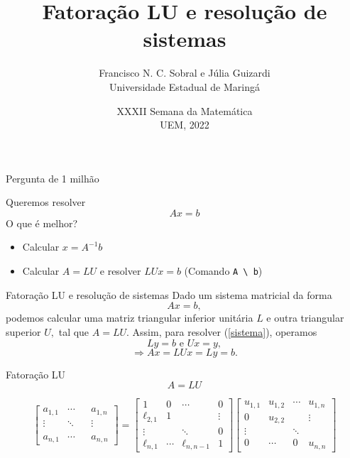 \documentclass[]{beamer}
\author[Sobral, Guizardi]{Francisco N. C. Sobral e Júlia Guizardi\\ Universidade Estadual de Maringá}
\date[XXIX SEMAT]{XXXII Semana da Matemática\\UEM, 2022}
\title[Mat. Mult.]{Fatoração LU e resolução de sistemas}
\newcommand{\code}[1]{\colorbox[gray]{0.8}{\texttt{#1}}}
\begin{document}
\begin{frame}[plain]
\titlepage
\end{frame}

\begin{frame}{Pergunta de 1 milhão}

  Queremos resolver
  \[
    Ax = b
  \]
  O que é melhor?
  \begin{itemize}
  \item Calcular $x = A^{-1} b$
  \item Calcular $A = LU$ e resolver $LUx = b$ (Comando \code{A \textbackslash\ b})
  \end{itemize}
  
\end{frame}

\begin{frame}{Fatoração LU e resolução de sistemas}
	Dado um sistema matricial da forma 
	\begin{equation}\label{sistema}
	Ax=b,
	\end{equation}
	podemos calcular uma matriz triangular inferior unitária $L$ e outra triangular superior $U,$ tal que $A=LU.$ Assim, para resolver (\ref{sistema}), operamos
	$$Ly=b \text{  e  } Ux=y,$$
	$$\Rightarrow Ax=LUx=Ly=b.$$
\end{frame}

\begin{frame}{Fatoração LU}
	\begin{equation}
	A=LU
	\end{equation}
	
	$$
	\begin{bmatrix}
	a_{1,1} & \cdots &  & a_{1,n}\\
	\vdots & \ddots  & & \vdots\\
	& &  & \\
	a_{n,1} & \cdots &  & a_{n,n}
	\end{bmatrix}
	=
	\begin{bmatrix}
	1 & 0 & \cdots & 0\\
	\ell_{2,1} & 1 & & \vdots\\
	\vdots & & \ddots & 0\\
	\ell_{n,1} & \cdots & \ell_{n,n-1} & 1
	\end{bmatrix}\begin{bmatrix}
	u_{1,1} & u_{1,2} & \cdots & u_{1,n}\\
	0 & u_{2,2} & & \vdots\\
	\vdots & & \ddots & \\
	0 & \cdots & 0 & u_{n,n}
	\end{bmatrix}
	$$
\end{frame}
\end{document}
